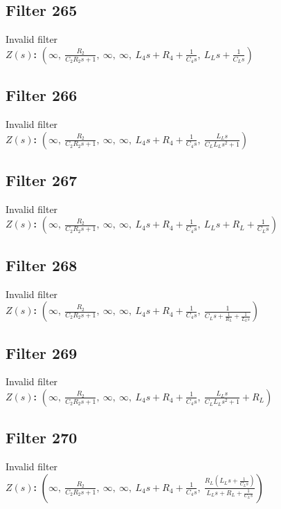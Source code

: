 \documentclass{article}
\begin{document}
\subsection*{Filter 265}
Invalid filter \\ 
\textbf{$Z(s)$:} $\left( \infty, \  \frac{R_{2}}{C_{2} R_{2} s + 1}, \  \infty, \  \infty, \  L_{4} s + R_{4} + \frac{1}{C_{4} s}, \  L_{L} s + \frac{1}{C_{L} s}\right)$ \\ 
\subsection*{Filter 266}
Invalid filter \\ 
\textbf{$Z(s)$:} $\left( \infty, \  \frac{R_{2}}{C_{2} R_{2} s + 1}, \  \infty, \  \infty, \  L_{4} s + R_{4} + \frac{1}{C_{4} s}, \  \frac{L_{L} s}{C_{L} L_{L} s^{2} + 1}\right)$ \\ 
\subsection*{Filter 267}
Invalid filter \\ 
\textbf{$Z(s)$:} $\left( \infty, \  \frac{R_{2}}{C_{2} R_{2} s + 1}, \  \infty, \  \infty, \  L_{4} s + R_{4} + \frac{1}{C_{4} s}, \  L_{L} s + R_{L} + \frac{1}{C_{L} s}\right)$ \\ 
\subsection*{Filter 268}
Invalid filter \\ 
\textbf{$Z(s)$:} $\left( \infty, \  \frac{R_{2}}{C_{2} R_{2} s + 1}, \  \infty, \  \infty, \  L_{4} s + R_{4} + \frac{1}{C_{4} s}, \  \frac{1}{C_{L} s + \frac{1}{R_{L}} + \frac{1}{L_{L} s}}\right)$ \\ 
\subsection*{Filter 269}
Invalid filter \\ 
\textbf{$Z(s)$:} $\left( \infty, \  \frac{R_{2}}{C_{2} R_{2} s + 1}, \  \infty, \  \infty, \  L_{4} s + R_{4} + \frac{1}{C_{4} s}, \  \frac{L_{L} s}{C_{L} L_{L} s^{2} + 1} + R_{L}\right)$ \\ 
\subsection*{Filter 270}
Invalid filter \\ 
\textbf{$Z(s)$:} $\left( \infty, \  \frac{R_{2}}{C_{2} R_{2} s + 1}, \  \infty, \  \infty, \  L_{4} s + R_{4} + \frac{1}{C_{4} s}, \  \frac{R_{L} \left(L_{L} s + \frac{1}{C_{L} s}\right)}{L_{L} s + R_{L} + \frac{1}{C_{L} s}}\right)$ \\ 
\end{document}
